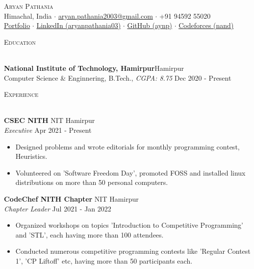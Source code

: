\documentclass[a4paper]{article}
\newcommand{\lineunder} {
    \vspace*{-8pt} \\
    \hspace*{-18pt} \hrulefill \\
}
\newcommand{\header} [1] {
    {\hspace*{-18pt}\vspace*{6pt} \textsc{#1}}
    \vspace*{-6pt} \lineunder
}
\begin{document}
\begin{center}
	{\Huge \scshape {Aryan Pathania}}\\
	\vspace{0.5mm}
	Himachal, India $\cdot$ \href{mailto: aryan.pathania2003@gmail.com}{aryan.pathania2003@gmail.com} $\cdot$ +91 94592 55020\\
	\vspace{0.5mm}
	\href{https://aryanpathania.vercel.app/}{Portfolio} $\cdot$
	\href{https://linkedin.com/in/aryanpathania03/}{LinkedIn (aryanpathania03)} $\cdot$
	\href{https://www.github.com/aynp}{GitHub (aynp)} $\cdot$
	\href{https://www.github.com/aynp}{Codeforces (nand)} \\
\end{center}


\header{Education}
\vspace{1mm}

\textbf{National Institute of Technology, Hamirpur}\hfill Hamirpur\\
Computer Science \& Enginnering, B.Tech., \textit{CGPA: 8.75} \hfill Dec 2020 - Present\\
\vspace{1.5mm}



\header{Experience}
\vspace{1mm}

\textbf{CSEC NITH} \hfill NIT Hamirpur\\
\textit{Executive} \hfill Apr 2021 - Present\\
\begin{itemize}
	\item Designed problems and wrote editorials for monthly programming contest, Heuristics.
	\item Volunteered on 'Software Freedom Day', promoted FOSS and installed linux distributions on more than 50 personal computers.
\end{itemize}
\vspace{1.5mm}

\textbf{CodeChef NITH Chapter} \hfill NIT Hamirpur\\
\textit{Chapter Leader} \hfill Jul 2021 - Jan 2022\\
\begin{itemize}
	\item Organized workshops on topics 'Introduction to Competitive Programming' and 'STL', each having more than 100 attendees.
	\item Conducted numerous competitive programming contests like 'Regular Contest 1', 'CP Liftoff' etc, having more than 50 participants each.
\end{itemize}
\vspace{1.5mm}
\end{document}
